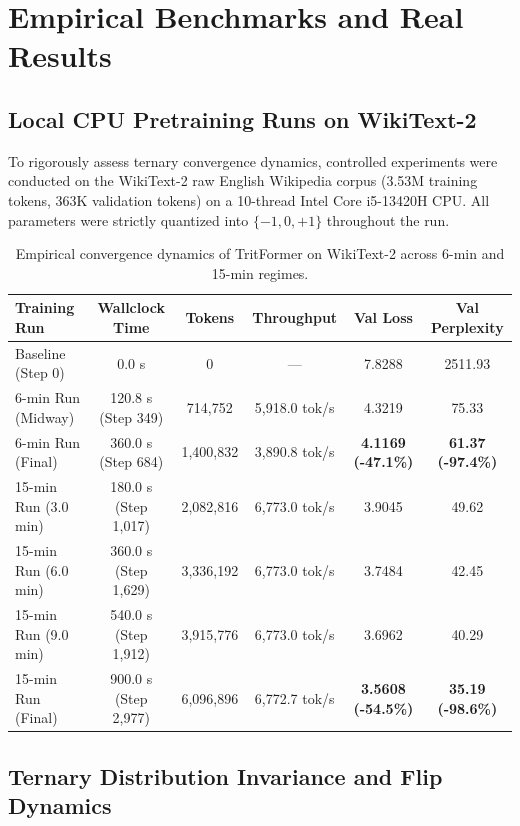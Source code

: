 \documentclass[11pt,a4paper]{article}
\begin{document}
\section{Empirical Benchmarks and Real Results}

\subsection{Local CPU Pretraining Runs on WikiText-2}

To rigorously assess ternary convergence dynamics, controlled experiments were conducted on the WikiText-2 raw English Wikipedia corpus (3.53M training tokens, 363K validation tokens) on a 10-thread Intel Core i5-13420H CPU. All parameters were strictly quantized into $\{-1, 0, +1\}$ throughout the run.

\begin{table}[h]
\centering
\small
\caption{Empirical convergence dynamics of TritFormer on WikiText-2 across 6-min and 15-min regimes.}
\vspace{0.4em}
\label{tab:convergence}
\begin{tabular}{lccccc}
\toprule
\textbf{Training Run} & \textbf{Wallclock Time} & \textbf{Tokens} & \textbf{Throughput} & \textbf{Val Loss} & \textbf{Val Perplexity} \\
\midrule
Baseline (Step 0) & 0.0 s & 0 & --- & 7.8288 & 2511.93 \\
6-min Run (Midway) & 120.8 s (Step 349) & 714,752 & 5,918.0 tok/s & 4.3219 & 75.33 \\
6-min Run (Final) & 360.0 s (Step 684) & 1,400,832 & 3,890.8 tok/s & \textbf{4.1169 (-47.1\%)} & \textbf{61.37 (-97.4\%)} \\
15-min Run (3.0 min) & 180.0 s (Step 1,017) & 2,082,816 & 6,773.0 tok/s & 3.9045 & 49.62 \\
15-min Run (6.0 min) & 360.0 s (Step 1,629) & 3,336,192 & 6,773.0 tok/s & 3.7484 & 42.45 \\
15-min Run (9.0 min) & 540.0 s (Step 1,912) & 3,915,776 & 6,773.0 tok/s & 3.6962 & 40.29 \\
15-min Run (Final) & 900.0 s (Step 2,977) & 6,096,896 & 6,772.7 tok/s & \textbf{3.5608 (-54.5\%)} & \textbf{35.19 (-98.6\%)} \\
\bottomrule
\end{tabular}
\end{table}

\subsection{Ternary Distribution Invariance and Flip Dynamics}
\end{document}
